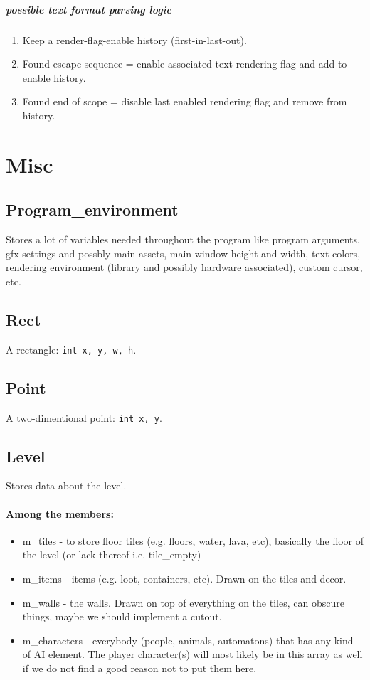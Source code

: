 \documentclass[a4paper,10pt]{book}
\begin{document}
\paragraph{possible text format parsing logic}
\begin{enumerate}
  \item Keep a render-flag-enable history (first-in-last-out).
  \item Found escape sequence = enable associated text rendering flag and add to
    enable history.
  \item Found end of scope = disable last enabled rendering flag and remove from
    history.
\end{enumerate}
\chapter{Misc}
\section{\enginenamespace{}Program\_environment}
Stores a lot of variables needed throughout the program like program arguments,
gfx settings and possbly main assets, main window height and width,
text colors, rendering environment (library and possibly hardware associated),
custom cursor, etc.
\section{\enginenamespace{}Rect}
A rectangle: \texttt{int x, y, w, h}.
\section{\enginenamespace{}Point}
A two-dimentional point: \texttt{int x, y}.
\section{\enginenamespace{}Level}
Stores data about the level.
\subsubsection*{Among the members:}
\begin{itemize}
  \item m\_tiles - to store floor tiles (e.g. floors, water, lava, etc),
    basically the floor of the level (or lack thereof i.e. tile\_empty)
  \item m\_items - items (e.g. loot, containers, etc). Drawn on the tiles and decor.
  \item m\_walls - the walls. Drawn on top of everything on the tiles, can
    obscure things, maybe we should implement a cutout.
  \item m\_characters - everybody (people, animals, automatons) that has any
    kind of AI element. The player character(s) will most likely be in this array
    as well if we do not find a good reason not to put them here.
\end{itemize}
\end{document}
